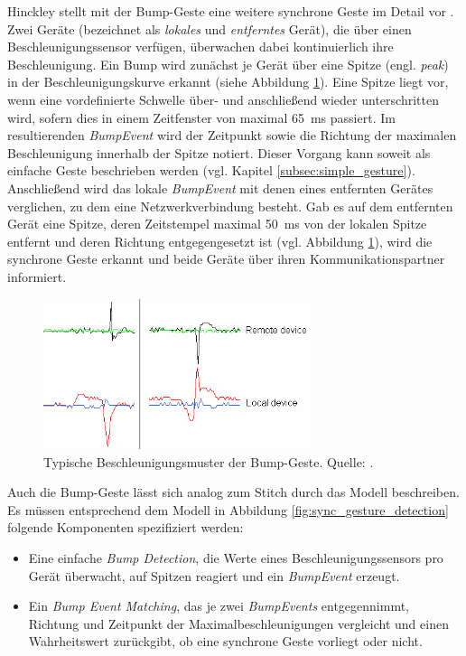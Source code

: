 Hinckley stellt mit der Bump-Geste eine weitere synchrone Geste im Detail vor \citep{Hinckley2003}. Zwei Geräte (bezeichnet als \textit{lokales} und \textit{entferntes} Gerät), die über einen Beschleunigungssensor verfügen, überwachen dabei kontinuierlich ihre Beschleunigung. Ein Bump wird zunächst je Gerät über eine Spitze (engl. \textit{peak}) in der Beschleunigungskurve erkannt (siehe Abbildung \ref{fig:bump_details}). Eine Spitze liegt vor, wenn eine vordefinierte Schwelle über- und anschließend wieder unterschritten wird, sofern dies in einem Zeitfenster von maximal \SI{65}{\milli\second} passiert. Im resultierenden \textit{BumpEvent} wird der Zeitpunkt sowie die Richtung der maximalen Beschleunigung innerhalb der Spitze notiert. Dieser Vorgang kann soweit als einfache Geste beschrieben werden (vgl. Kapitel \ref{subsec:simple_gesture}). Anschließend wird das lokale \textit{BumpEvent} mit denen eines entfernten Gerätes verglichen, zu dem eine Netzwerkverbindung besteht. Gab es auf dem entfernten Gerät eine Spitze, deren Zeitstempel maximal \SI{50}{\milli\second} von der lokalen Spitze entfernt und deren Richtung entgegengesetzt ist (vgl. Abbildung \ref{fig:bump_details}), wird die synchrone Geste erkannt und beide Geräte über ihren Kommunikationspartner informiert.
\begin{figure}[h]
\centering
\includegraphics[width=0.7\textwidth]{bilder/bump_accel.png}
\caption{Typische Beschleunigungsmuster der Bump-Geste. Quelle: \citep{Hinckley2003}.}
\label{fig:bump_details}
\end{figure}

Auch die Bump-Geste lässt sich analog zum Stitch durch das Modell beschreiben. Es müssen entsprechend dem Modell in Abbildung \ref{fig:sync_gesture_detection} folgende Komponenten spezifiziert werden:
\begin{itemize}
\item Eine einfache \textit{Bump Detection}, die Werte eines Beschleunigungssensors pro Gerät überwacht, auf Spitzen reagiert und ein \textit{BumpEvent} erzeugt.
\item Ein \textit{Bump Event Matching}, das je zwei \textit{BumpEvents} entgegennimmt, Richtung und Zeitpunkt der Maximalbeschleunigungen vergleicht und einen Wahrheitswert zurückgibt, ob eine synchrone Geste vorliegt oder nicht.
\end{itemize}

